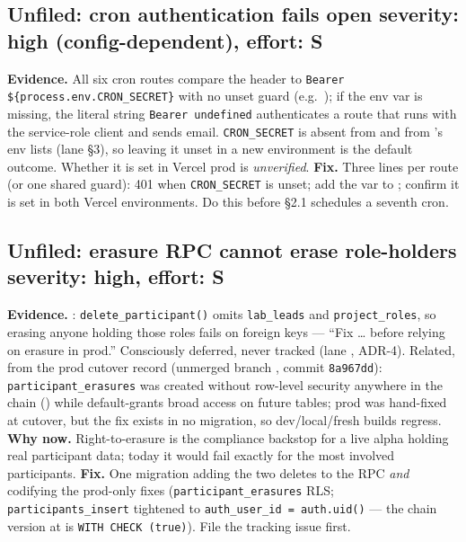 \documentclass[10pt]{article}
\newcommand{\sev}[1]{\textbf{#1}}
\begin{document}
\subsection{Unfiled: cron authentication fails open \hfill \sev{severity: high (config-dependent), effort: S}}
\textbf{Evidence.} All six cron routes compare the header to \texttt{Bearer \$\{process.env.CRON\_SECRET\}} with no unset guard (e.g.\ ); if the env var is missing, the literal string \texttt{Bearer undefined} authenticates a route that runs with the service-role client and sends email. \texttt{CRON\_SECRET} is absent from  and from 's env lists (lane  \S3), so leaving it unset in a new environment is the default outcome. Whether it is set in Vercel prod is \emph{unverified}.
\textbf{Fix.} Three lines per route (or one shared guard): 401 when \texttt{CRON\_SECRET} is unset; add the var to ; confirm it is set in both Vercel environments. Do this before \S2.1 schedules a seventh cron.

\subsection{Unfiled: erasure RPC cannot erase role-holders \hfill \sev{severity: high, effort: S}}
\textbf{Evidence.} : \texttt{delete\_participant()} omits \texttt{lab\_leads} and \texttt{project\_roles}, so erasing anyone holding those roles fails on foreign keys --- ``Fix \ldots{} before relying on erasure in prod.'' Consciously deferred, never tracked (lane , ADR-4). Related, from the prod cutover record (unmerged branch , commit \texttt{8a967dd}): \texttt{participant\_erasures} was created without row-level security anywhere in the chain () while  default-grants broad access on future tables; prod was hand-fixed at cutover, but the fix exists in no migration, so dev/local/fresh builds regress.
\textbf{Why now.} Right-to-erasure is the compliance backstop for a live alpha holding real participant data; today it would fail exactly for the most involved participants.
\textbf{Fix.} One migration adding the two deletes to the RPC \emph{and} codifying the prod-only fixes (\texttt{participant\_erasures} RLS; \texttt{participants\_insert} tightened to \texttt{auth\_user\_id = auth.uid()} --- the chain version at  is \texttt{WITH CHECK (true)}). File the tracking issue first.
\end{document}
